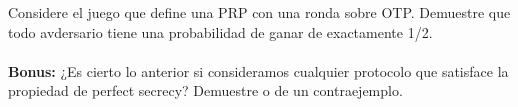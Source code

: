 
Considere el juego que define una PRP con una ronda sobre OTP. Demuestre que todo avdersario tiene una probabilidad de ganar de exactamente 1/2.
\\
\\
\textbf{Bonus:} ¿Es cierto lo anterior si consideramos cualquier protocolo que satisface la propiedad de perfect secrecy? Demuestre o de un contraejemplo.
